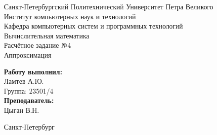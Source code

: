 \begin{titlepage}	%

	\begin{center}		%

		\large Санкт-Петербургский Политехнический Университет Петра Великого\\
		\large Институт компьютерных наук и технологий \\
		\large Кафедра компьютерных систем и программных технологий\\[4cm]
		
		 \huge Вычислительная математика\\[0.3cm] %
		 \large Расчётное задание №4\\[0.1cm]
		 \large Аппроксимация\\[8cm]

	\end{center}


	\begin{flushright} %
		\begin{minipage}{0.35\textwidth} %
			\begin{flushleft} %

				\large\textbf{Работу выполнил:}\\
				\large Ламтев А.Ю.\\
				\large {Группа:} 23501/4\\
				
				\large \textbf{Преподаватель:}\\
				\large Цыган В.Н.

			\end{flushleft}
		\end{minipage}
	\end{flushright}
	
	\vfill %

	\begin{center}
	\large Санкт-Петербург\\
	\large \the\year %
	\end{center} %

\thispagestyle{empty} %
\end{titlepage} %

\vfill %
